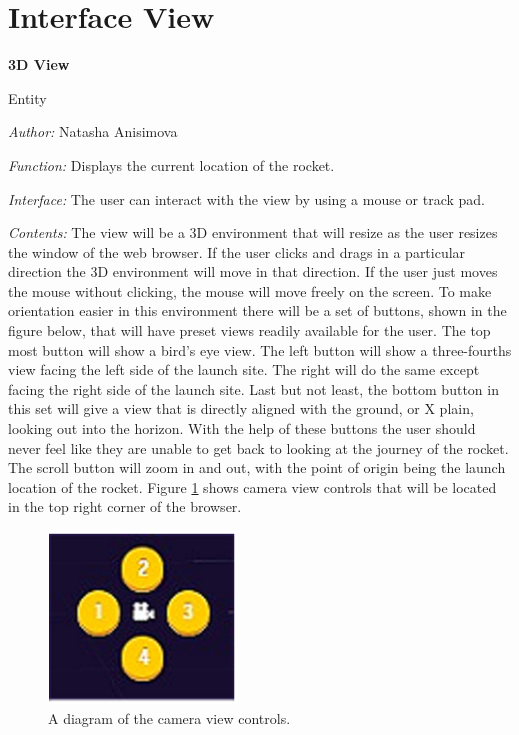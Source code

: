 \documentclass[10pt,draftclsnofoot,onecolumn]{IEEEtran}
\newcommand{\newinterface}[5]{
	\begin{minipage}{\linewidth}
		\noindent\textbf{#2}
		
		\noindent Entity
		
		\noindent\textit{Author:} {#1}
		
		\noindent\textit{Function:} {#3}
		
		\noindent\textit{Interface:} {#4}		
		
		\noindent\textit{Contents:} {#5}
		\vspace{.5cm}
	\end{minipage}
}
\begin{document}
	\section{Interface View}
	
	\newinterface
	{Natasha Anisimova}
	{3D View}
	{Displays the current location of the rocket.}
	{The user can interact with the view by using a mouse or track pad.}
	{
		The view will be a 3D environment that will resize as the user
		resizes the window of the web browser. If the user clicks and drags in a particular direction
		the 3D environment will move in that direction. If the user just moves the mouse without clicking, the mouse will move freely on the screen. To make orientation easier in this environment there will be a set of buttons, shown in the figure below, that will have preset views readily available for the user. The top most button will show a bird's eye view. The left button will show a three-fourths view facing the left side of the launch site. The right will do the same except facing the right side of the launch site. Last but not least, the bottom button in this set will give a view that is directly aligned with the ground, or X plain, looking out into the horizon. With the help of these buttons the user should never feel like they are unable to get back to looking at the journey of the rocket. The scroll button will zoom in and out, with the point of origin being the launch location of the rocket. Figure \ref{fig:1} shows camera view controls that will be located in the top right corner of the browser.
	}
	\begin{center}
	\begin{figure}[htbp!]
		\centering\includegraphics[width=5cm]{cameracontrols.eps}
		\caption{A diagram of the camera view controls.}
		\label{fig:1}
	\end{figure}
	\end{center}
\end{document}
